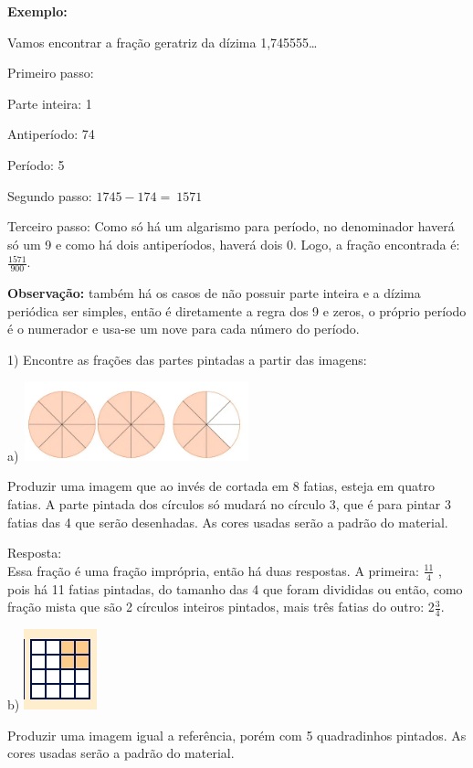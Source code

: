 {{{\textbf{Exemplo:}

Vamos encontrar a fração geratriz da dízima 1,745555\ldots{}

Primeiro passo:

Parte inteira: 1

Antiperíodo: 74

Período: 5

Segundo passo: \(1745 - 174 = \ 1571\)

Terceiro passo: Como só há um algarismo para período, no denominador
haverá só um 9 e como há dois antiperíodos, haverá dois 0. Logo, a
fração encontrada é: \(\frac{1571}{900}.\)

\textbf{Observação:} também há os casos de não possuir parte inteira e a
dízima periódica ser simples, então é diretamente a regra dos 9 e zeros,
o próprio período é o numerador e usa-se um nove para cada número do
período.


1) Encontre as frações das partes pintadas a partir das imagens:

a)
\includegraphics[width=2.59149in,height=0.89856in]{./imgSAEB_7_MAT/media/image7.png}

Produzir uma imagem que ao invés de cortada em 8 fatias, esteja em
quatro fatias. A parte pintada dos círculos só mudará no círculo 3, que
é para pintar 3 fatias das 4 que serão desenhadas. As cores usadas serão
a padrão do material.

Resposta:\\
Essa fração é uma fração imprópria, então há duas respostas. A primeira:
\(\frac{11}{4}\) , pois há 11 fatias pintadas, do tamanho das 4 que
foram divididas ou então, como fração mista que são 2 círculos inteiros
pintados, mais três fatias do outro: 2\(\frac{3}{4}\).

b)
\includegraphics[width=0.83333in,height=0.91667in]{./imgSAEB_7_MAT/media/image8.png}

Produzir uma imagem igual a referência, porém com 5 quadradinhos
pintados. As cores usadas serão a padrão do material.

}}}

